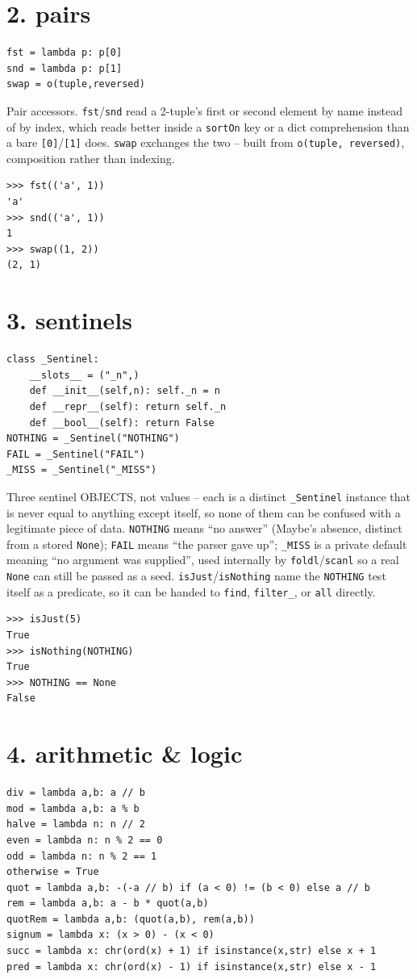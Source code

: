 \documentclass[10pt,letterpaper]{book}
\begin{document}
\section*{2. pairs}
\begin{lstlisting}[style=code]
fst = lambda p: p[0]
snd = lambda p: p[1]
swap = o(tuple,reversed)
\end{lstlisting}

Pair accessors. \texttt{fst}/\texttt{snd} read a 2-tuple's first or second element by name instead
of by index, which reads better inside a \texttt{sortOn} key or a dict comprehension than a bare
\texttt{[0]}/\texttt{[1]} does. \texttt{swap} exchanges the two -- built from \texttt{o(tuple,
reversed)}, composition rather than indexing.
\begin{lstlisting}[style=ex]
>>> fst(('a', 1))
'a'
>>> snd(('a', 1))
1
>>> swap((1, 2))
(2, 1)
\end{lstlisting}
\section*{3. sentinels}
\begin{lstlisting}[style=code]
class _Sentinel:
    __slots__ = ("_n",)
    def __init__(self,n): self._n = n
    def __repr__(self): return self._n
    def __bool__(self): return False
NOTHING = _Sentinel("NOTHING")
FAIL = _Sentinel("FAIL")
_MISS = _Sentinel("_MISS")
\end{lstlisting}

Three sentinel OBJECTS, not values -- each is a distinct \texttt{\_Sentinel} instance that is never
equal to anything except itself, so none of them can be confused with a legitimate piece of data.
\texttt{NOTHING} means ``no answer'' (Maybe's absence, distinct from a stored \texttt{None});
\texttt{FAIL} means ``the parser gave up''; \texttt{\_MISS} is a private default meaning ``no argument
was supplied'', used internally by \texttt{foldl}/\texttt{scanl} so a real \texttt{None} can still be
passed as a seed. \texttt{isJust}/\texttt{isNothing} name the \texttt{NOTHING} test itself as a
predicate, so it can be handed to \texttt{find}, \texttt{filter\_}, or \texttt{all} directly.
\begin{lstlisting}[style=ex]
>>> isJust(5)
True
>>> isNothing(NOTHING)
True
>>> NOTHING == None
False
\end{lstlisting}
\section*{4. arithmetic \& logic}
\begin{lstlisting}[style=code]
div = lambda a,b: a // b
mod = lambda a,b: a % b
halve = lambda n: n // 2
even = lambda n: n % 2 == 0
odd = lambda n: n % 2 == 1
otherwise = True
quot = lambda a,b: -(-a // b) if (a < 0) != (b < 0) else a // b
rem = lambda a,b: a - b * quot(a,b)
quotRem = lambda a,b: (quot(a,b), rem(a,b))
signum = lambda x: (x > 0) - (x < 0)
succ = lambda x: chr(ord(x) + 1) if isinstance(x,str) else x + 1
pred = lambda x: chr(ord(x) - 1) if isinstance(x,str) else x - 1
\end{lstlisting}
\end{document}
